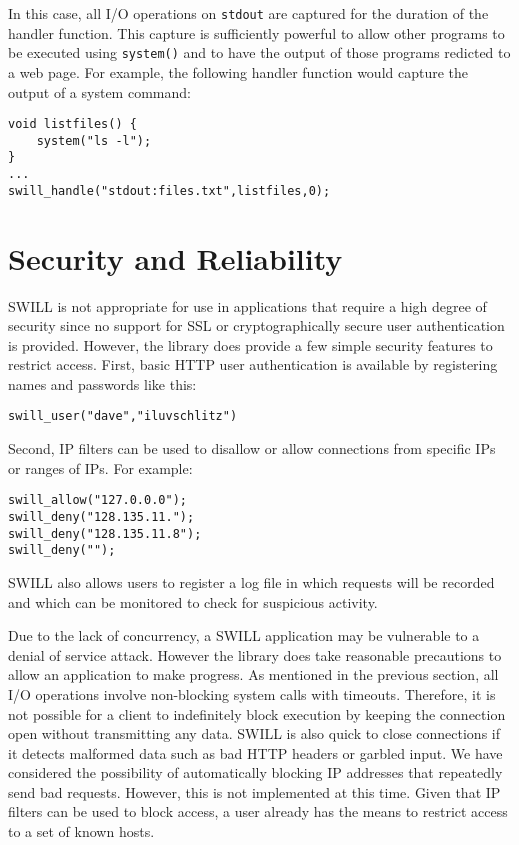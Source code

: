 In this case, all I/O operations on {\tt stdout} are captured for the duration
of the handler function.  This capture is sufficiently powerful to allow 
other programs to be executed using {\tt system()} and to have the output
of those programs redicted to a web page.  For example, the following handler
function would capture the output of a system command:

\begin{verbatim}
void listfiles() {
    system("ls -l");
}
...
swill_handle("stdout:files.txt",listfiles,0);
\end{verbatim}

\section{Security and Reliability}

SWILL is not appropriate for use in applications that require a high
degree of security since no support for SSL or cryptographically
secure user authentication is provided.  However, the library does
provide a few simple security features to restrict access.  First,
basic HTTP user authentication is available by registering names and
passwords like this:

\begin{verbatim}
swill_user("dave","iluvschlitz")
\end{verbatim}

Second, IP filters can be used to disallow or allow connections from
specific IPs or ranges of IPs.  For example:

\begin{verbatim}
swill_allow("127.0.0.0");  
swill_deny("128.135.11."); 
swill_deny("128.135.11.8");
swill_deny("");    
\end{verbatim}

SWILL also allows users to register a log file in which requests will
be recorded and which can be monitored to check for suspicious
activity.

Due to the lack of concurrency, a SWILL application may be vulnerable
to a denial of service attack.  
However the library does take reasonable precautions to allow an application to make progress. 
As mentioned in the previous section, all I/O operations involve
non-blocking system calls with timeouts.  Therefore, it is not
possible for a client to indefinitely block execution by keeping the
connection open without transmitting any data.   SWILL is also quick to close
connections if it detects malformed data such as bad HTTP headers or garbled
input.   We have considered the possibility of automatically blocking
IP addresses that repeatedly send bad requests.  
However, this is not implemented
at this time.  Given that IP filters can be used to block access, a user
already has the means to restrict access to a set of known hosts.

